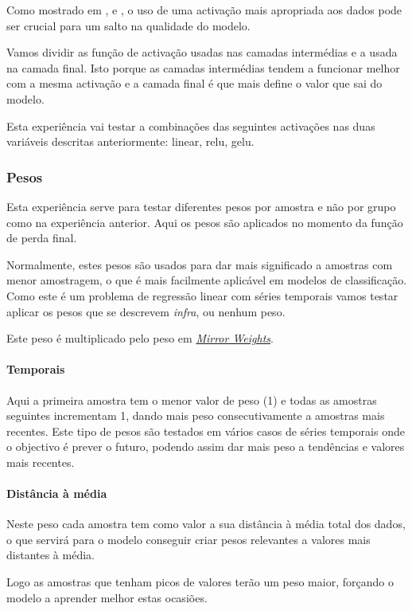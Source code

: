 Como mostrado em \cite{Vaswani2017}, e \cite{Liu2022}, o uso de uma activação mais apropriada aos dados pode ser crucial para um salto na qualidade do modelo.\par
Vamos dividir as função de activação usadas nas camadas intermédias e a usada na camada final. Isto porque as camadas intermédias tendem a funcionar melhor com a mesma activação e a camada final é que mais define o valor que sai do modelo.\par
Esta experiência vai testar a combinações das seguintes activações nas duas variáveis descritas anteriormente: linear, relu, gelu.\par


\subsubsection{Pesos}

Esta experiência serve para testar diferentes pesos por amostra e não por grupo como na experiência anterior. Aqui os pesos são aplicados no momento da função de perda final.\par
Normalmente, estes pesos são usados para dar mais significado a amostras com menor amostragem, o que é mais facilmente aplicável em modelos de classificação. Como este é um problema de regressão linear com séries temporais vamos testar aplicar os pesos que se descrevem \textit{infra}, ou nenhum peso.\par
Este peso é multiplicado pelo peso em \hyperref[se:advancedloss]{\textit{Mirror Weights}}.


\paragraph{Temporais}
\text{ }  \par
Aqui a primeira amostra tem o menor valor de peso (1) e todas as amostras seguintes incrementam 1, dando mais peso consecutivamente a amostras mais recentes. Este tipo de pesos são testados em vários casos de séries temporais onde o objectivo é prever o futuro, podendo assim dar mais peso a tendências e valores mais recentes.\par

\paragraph{Distância à média}
\text{ }  \par
Neste peso cada amostra tem como valor a sua distância à média total dos dados, o que servirá para o modelo conseguir criar pesos relevantes a valores mais distantes à média.\par
Logo as amostras que tenham picos de valores terão um peso maior, forçando o modelo a aprender melhor estas ocasiões.

